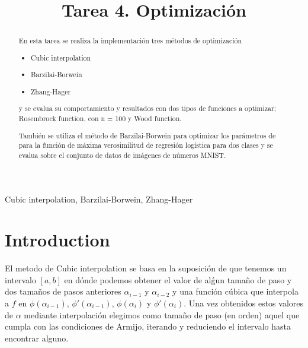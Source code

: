 \documentclass[conference]{IEEEtran}
\begin{document}
\title{Tarea 4. Optimización }

\author{
}

\maketitle

\begin{abstract}
En esta tarea se realiza la implementación tres métodos de optimización

\begin{itemize}
	\item Cubic interpolation
	\item Barzilai-Borwein
	\item Zhang-Hager
\end{itemize}

y se evalua su comportamiento y resultados con dos tipos de funciones a
optimizar; Rosembrock function, con n = 100 y Wood function.

También se utiliza el método de Barzilai-Borwein para optimizar los parámetros
de para la función de máxima verosimilitud de regresión logística para dos clases y se evalua sobre
el conjunto de datos de imágenes de números MNIST.


\end{abstract}

\begin{IEEEkeywords}
Cubic interpolation, Barzilai-Borwein, Zhang-Hager
\end{IEEEkeywords}

\section{Introduction}

El metodo de Cubic interpolation se basa en la suposición de que tenemos un
intervalo $[a,b]$ en dónde podemos obtener el valor de alǵun tamaño de paso
y dos tamaños de pasos anteriores $\alpha_{i-1}$ y $\alpha_{i-2}$ y una función
cúbica que interpola a $f$ en $\phi(\alpha_{i-1})$, $\phi'(\alpha_{i-1})$,
$\phi(\alpha_{i})$ y $\phi'(\alpha_{i})$. Una vez obtenidos estos valores de
$\alpha$ mediante interpolación elegimos como tamaño de paso (en orden) aquel
que cumpla con las condiciones de Armijo, iterando y reduciendo el intervalo
hasta encontrar alguno.\\
\end{document}
